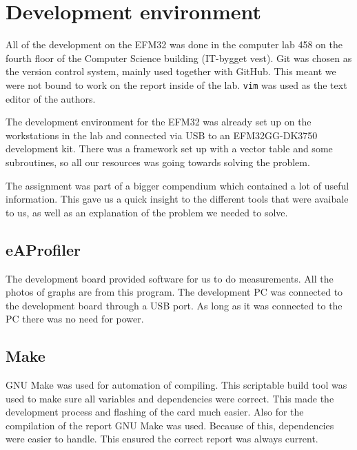 \section{Development environment}
All of the development on the EFM32 was done in the computer lab 458 on the fourth floor of the Computer Science building (IT-bygget vest). Git was chosen as the version control system, mainly used together with GitHub. This meant we were not bound to work on the report inside of the lab. \texttt{vim} was used as the text editor of the authors.

The development environment for the EFM32 was already set up on the workstations in the lab and connected via USB to an EFM32GG-DK3750 development kit. There was a framework set up with a vector table and some subroutines, so all our resources was going towards solving the problem.

The assignment was part of a bigger compendium \cite{eeds-compendium} which contained a lot of useful information. This gave us a quick insight to the different tools that were avaibale to us, as well as an explanation of the problem we needed to solve.

\subsection{eAProfiler}
The development board provided software for us to do measurements. All the photos of graphs are from this program. The development PC was connected to the development board through a USB port. As long as it was connected to the PC there was no need for power.

\subsection{Make}
GNU Make was used for automation of compiling. This scriptable build tool was used to make sure all variables and dependencies were correct. This made the development process and flashing of the card much easier. Also for the compilation of the report GNU Make was used. Because of this, dependencies were easier to handle. This ensured the correct report was always current.

